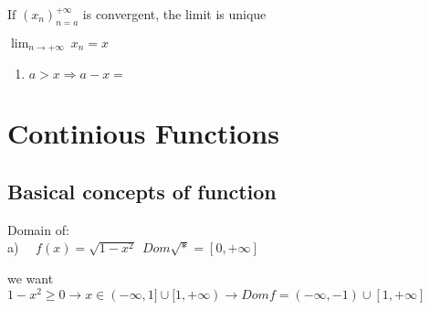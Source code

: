 \documentclass[12pt, a4paper]{book}
\begin{document}
\begin{prop}
  $\text{If } (x_n)^{+\infty}_{n=a}$ is convergent, the limit is unique
\end{prop}

\begin{exmp} $\lim_{n \rightarrow +\infty} \ x_n=x$
  \begin{enumerate}[label=\alph*]
    \item $a>x \Rightarrow a-x=$
  \end{enumerate}
  
\end{exmp}

\chapter{Continious Functions}

\section{Basical concepts of function}

\begin{exmp}
  Domain of: \\
  a) \ \ $f(x) = \sqrt{1-x^2} \ \ Dom\sqrt{*} = [0, +\infty]$

  we want $ 1-x^2 \geq 0 \rightarrow x \in (-\infty, 1] \cup [1, +\infty) \rightarrow Dom f = (-\infty, -1) \cup [1, +\infty] $
\end{exmp}
\end{document}
